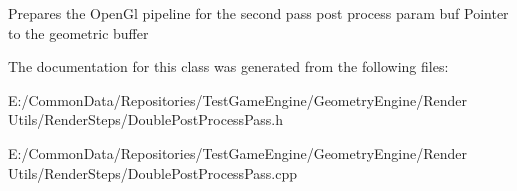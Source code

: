 Prepares the Open\+Gl pipeline for the second pass post process param buf Pointer to the geometric buffer 

The documentation for this class was generated from the following files\+:\begin{DoxyCompactItemize}
\item 
E\+:/\+Common\+Data/\+Repositories/\+Test\+Game\+Engine/\+Geometry\+Engine/\+Render Utils/\+Render\+Steps/Double\+Post\+Process\+Pass.\+h\item 
E\+:/\+Common\+Data/\+Repositories/\+Test\+Game\+Engine/\+Geometry\+Engine/\+Render Utils/\+Render\+Steps/Double\+Post\+Process\+Pass.\+cpp\end{DoxyCompactItemize}
